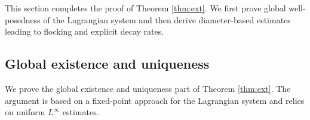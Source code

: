 \documentclass[10pt,reqno]{amsart}
\numberwithin{equation}{section}
\begin{document}
This section completes the proof of Theorem \ref{thm:ext}. We first prove global well-posedness of the Lagrangian system and then derive diameter-based estimates leading to flocking and explicit decay rates.

%
%
%                      
%
%
 \subsection{Global existence and uniqueness}
 
We prove the global existence and uniqueness part of Theorem \ref{thm:ext}. The argument is based on a fixed-point approach for the Lagrangian system and relies on uniform $L^\infty$ estimates.
 
\end{document}
